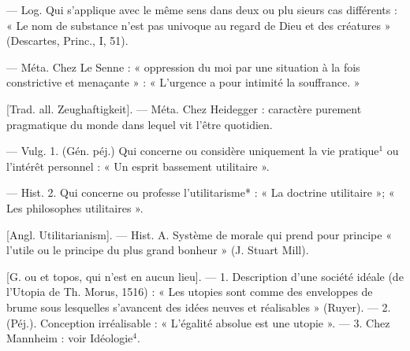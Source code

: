 \begin{itemize}[leftmargin=1cm, label=, itemsep=1pt]
 — Log. Qui s'applique avec
le même sens dans deux ou plu
sieurs cas différents : « Le nom de
substance n'est pas univoque au
regard de Dieu et des créatures »
(Descartes, Princ., I, 51).

 — Méta. Chez Le Senne :
« oppression du moi par une situation à la fois constrictive et menaçante » : « L’urgence a pour intimité
la souffrance. »

 [Trad. all. Zeughaftigkeit].
— Méta. Chez Heidegger : caractère
purement pragmatique du monde
dans lequel vit l’être quotidien.

 — Vulg. 1. (Gén. péj.) Qui
concerne ou considère uniquement
la vie pratique$^1$ ou l'intérêt personnel : « Un esprit bassement utilitaire ».

— Hist. 2. Qui concerne ou professe l’utilitarisme* : « La doctrine
utilitaire »; « Les philosophes utilitaires ».

 [Angl. Utilitarianism]. —
Hist. A. Système de morale qui
prend pour principe « l’utile ou le
principe du plus grand bonheur »
(J. Stuart Mill).

 [G. ou et topos, qui n’est en
aucun lieu]. — 1. Description d’une
société idéale (de l’Utopia de Th. Morus, 1516) : « Les utopies sont comme
des enveloppes de brume sous lesquelles s’avancent des idées neuves
et réalisables » (Ruyer). — 2. (Péj.).
Conception irréalisable : « L'égalité
absolue est une utopie ». — 3. Chez
Mannheim : voir Idéologie$^4$.

	\end{itemize}

